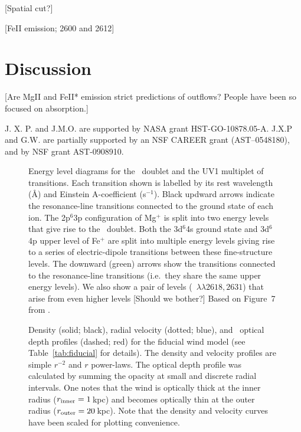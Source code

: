 \documentclass[12pt,preprint]{aastex}
\begin{document}
{[Spatial cut?]

[FeII emission;  2600 and 2612]

\section{Discussion}

[Are MgII and FeII* emission strict predictions of outflows?  People
have been so focused on absorption.]

\acknowledgments

J. X. P. and J.M.O. are supported by NASA grant
HST-GO-10878.05-A.  J.X.P and G.W. are partially supported
by an NSF CAREER grant (AST--0548180), and 
by NSF grant AST-0908910.








\begin{figure}
\caption{
Energy level diagrams for the \mgiid\ doublet and the UV1
multiplet of  transitions.   Each transition shown is
labelled by its rest wavelength (\AA) and Einstein A-coefficient
(s$^{-1}$). Black updward arrows
indicate the resonance-line transitions connected to the ground
state of each ion.  The 2p$^6$3p configuration of Mg$^+$ is split into
two energy levels that give rise to the \mgiid\ doublet.  
Both the 3d$^6$4s ground state and 3d$^6$4p upper level of Fe$^+$
are split into multiple energy levels giving rise to a series of
electric-dipole transitions between these fine-structure levels.   
The downward (green) arrows show the transitions connected to the
resonance-line transitions (i.e.\ they share the same upper energy
levels).  We also show a pair of levels (~$\lambda\lambda
2618,2631$) that arise from even higher levels [Should we bother?]
Based on Figure~7 from \cite{hartagan9X}.
}
\label{fig:energy}
\end{figure}

\begin{figure}
\caption{
Density (solid; black), radial velocity (dotted; blue), and
\mgiia\ optical depth profiles (dashed; red) for the fiducial
wind model (see Table~\ref{tab:fiducial} for details).
The density and velocity profiles are simple $r^{-2}$ and $r$
power-laws.  The optical depth profile was calculated by summing
the opacity at small and discrete radial intervals.  One notes that
the wind is optically thick at the inner radius ($r_{\rm inner} =
1$\,kpc) and becomes optically thin at the outer radius ($r_{\rm
  outer} = 20$\,kpc).
Note that the density and velocity curves have been scaled for plotting
convenience.  
}
\label{fig:fiducial_nvt}
\end{figure}

}
\end{document}
